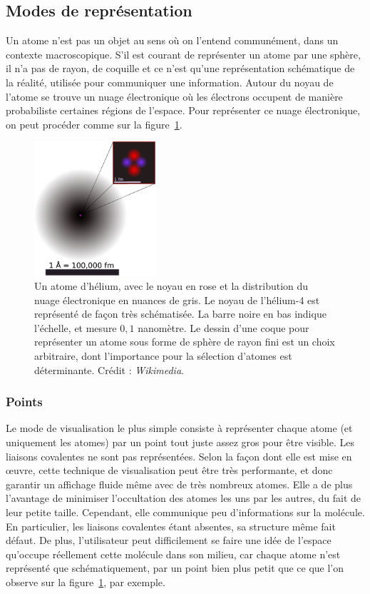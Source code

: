 \begin{appendices}
	\subsection{Modes de représentation}
	Un atome n'est pas un objet au sens où on l'entend communément, dans un contexte macroscopique. S'il est courant de représenter un atome par une sphère, il n'a pas de rayon, de \og coquille \fg{} et ce n'est qu'une représentation schématique de la réalité, utilisée pour communiquer une information. Autour du noyau de l'atome se trouve un nuage électronique où les électrons occupent de manière probabiliste certaines régions de l'espace. Pour représenter ce nuage électronique, on peut procéder comme sur la figure~\ref{fig:helium}.
	
	\begin{figure}[!htbp]
		\centering
		\includegraphics[width=0.40\textwidth]{figures/ch1/helium}
		\caption[Un atome d'hélium avec son nuage électronique]{Un atome d'hélium, avec le noyau en rose et la distribution du nuage électronique en nuances de gris. Le noyau de l'hélium-4 est représenté de façon très schématisée. La barre noire en bas indique l'échelle, et mesure $0,1$ nanomètre. Le dessin d'une \og coque \fg{}  pour représenter un atome sous forme de sphère de rayon fini est un choix arbitraire, dont l'importance pour la sélection d'atomes est déterminante. Crédit : \emph{Wikimedia}.}
		\label{fig:helium}
	\end{figure}
	
	\subsubsection{Points} Le mode de visualisation le plus simple consiste à représenter chaque atome (et uniquement les atomes) par un point tout juste assez gros pour être visible. Les liaisons covalentes ne sont pas représentées. Selon la façon dont elle est mise en œuvre, cette technique de visualisation peut être très performante, et donc garantir un affichage fluide même avec de très nombreux atomes. Elle a de plus l'avantage de minimiser l'occultation des atomes les uns par les autres, du fait de leur petite taille. Cependant, elle communique peu d'informations sur la molécule. En particulier, les liaisons covalentes étant absentes, sa structure même fait défaut. De plus, l'utilisateur peut difficilement se faire une idée de l'espace qu'occupe réellement cette molécule dans son milieu, car chaque atome n'est représenté que schématiquement, par un point bien plus petit que ce que l'on observe sur la figure~\ref{fig:helium}, par exemple.
		

\end{appendices}
